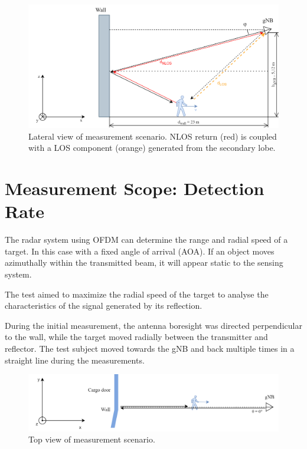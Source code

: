 \begin{figure}[H]
	\centering
	\includegraphics[width=1\textwidth]{Images/Test1/base-lateral_view_los_geometry}
	\caption{\small Lateral view of measurement scenario. NLOS return (red) is coupled with a LOS component (orange) generated from the secondary lobe.}
	\label{fig:Test1_base-lateral_view}
\end{figure}

\section{Measurement Scope: Detection Rate}

The radar system using OFDM can determine the range and radial speed of a target.\alert{ In this case with a fixed angle of arrival (AOA).} If an object moves azimuthally within the transmitted beam, it will appear static to the sensing system.

The test aimed to maximize the radial speed of the target to analyse the characteristics of the signal generated by its reflection.

During the initial measurement, the antenna boresight was directed perpendicular to the wall, while the target moved radially between the transmitter and reflector. The test subject moved towards the gNB and back multiple times in a straight line during the measurements.

\begin{figure}[H]
	\centering
	\includegraphics[width=1\textwidth]{Images/Test1/base-top_view}
	\caption{\small Top view of measurement scenario.}
	\label{fig:Test1_base-top_view}
\end{figure}


